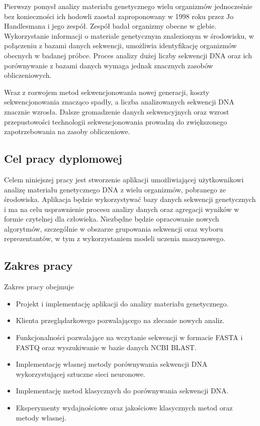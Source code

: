     Pierwszy pomysł analizy materiału genetycznego wielu organizmów jednocześnie bez konieczności ich hodowli zaostał zaproponowany w 1998 roku przez Jo Handlesmana i jego zespół\cite{Handelsman:1998}. Zespół badał organizmy obecne w glebie. Wykorzystanie informacji o materiale genetycznym znalezionym w środowisku, w połączeniu z bazami danych sekwencji, umożliwia  identyfikację organizmów obecnych w badanej próbce. Proces analizy dużej liczby sekwencji DNA oraz ich porównywanie z bazami danych wymaga jednak znacznych zasobów obliczeniowych.

    Wraz z rozwojem metod sekwencjonowania nowej generacji\cite{Reinartz:2002}, koszty sekwencjonowania znacząco spadły, a liczba analizowanych sekwencji DNA znacznie wzrosła\cite{Muir:2016}. Dalsze gromadzenie danych sekwencyjnych oraz wzrost przepustowości technologii sekwencjonowania prowadzą do zwiększonego zapotrzebowania na zasoby obliczeniowe.

    \subsection{Cel pracy dyplomowej}

        Celem niniejszej pracy jest stworzenie aplikacji umożliwiającej użytkownikowi analizę materiału genetycznego DNA z wielu organizmów, pobranego ze środowiska. Aplikacja będzie wykorzystywać bazy danych sekwencji genetycznych i ma na celu usprawnienie procesu analizy danych oraz agregacji wyników w formie czytelnej dla człowieka. Niezbędne będzie opracowanie nowych algorytmów, szczególnie w obszarze grupowania sekwencji oraz wyboru reprezentantów, w tym z wykorzystaniem modeli uczenia maszynowego.

    \subsection {Zakres pracy}

        Zakres pracy obejmuje
        \begin{itemize}
            \item {
                Projekt i implementację aplikacji do analizy materiału genetycznego.
            }
            \item {
                Klienta przeglądarkowego pozwalającego na zlecanie nowych analiz.
            }
            \item {
                Funkcjonalności pozwalające na wczytanie sekwencji w formacie FASTA i FASTQ oraz wyszukiwanie w bazie danych NCBI BLAST.
            }
            \item {
                Implementację własnej metody porównywania sekwencji DNA wykorzystującej sztuczne sieci neuronowe.
            }
            \item {
                Implementację metod klasycznych do porównywania sekwencji DNA.
            }
            \item {
                Eksperymenty wydajnościowe oraz jakościowe klasycznych metod oraz metody własnej.
            }
        \end{itemize}

